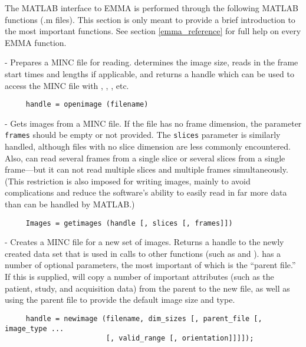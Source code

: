 The MATLAB interface to EMMA is performed through the following MATLAB
functions (.m files).  This section is only meant to provide a brief
introduction to the most important functions.  See section
\ref{emma_reference} for full help on every EMMA function.

\begin{description}

\item {} - Prepares a MINC file for reading.
 determines the image size, reads in the frame start
times and lengths if applicable, and returns a handle which can be
used to access the MINC file with ,
, , etc.
\begin{verbatim}
     handle = openimage (filename)
\end{verbatim}

\item {} - Gets images from a MINC file.  If the
file has no frame dimension, the parameter \verb|frames| should be
empty or not provided.  The \verb|slices| parameter is similarly
handled, although files with no slice dimension are less commonly
encountered.  Also,  can read several frames from a
single slice or several slices from a single frame---but it can not
read multiple slices and multiple frames simultaneously.  (This
restriction is also imposed for writing images, mainly to avoid
complications and reduce the software's ability to easily read in far
more data than can be handled by MATLAB.)
\begin{verbatim}
     Images = getimages (handle [, slices [, frames]])
\end{verbatim}

\item {} - Creates a MINC file for a new set of images.
Returns a handle to the newly created data set that is used in calls
to other functions (such as  and ).
 has a number of optional parameters, the most
important of which is the ``parent file.''  If this is supplied,
 will copy a number of important attributes (such as
the patient, study, and acquisition data) from the parent to the new
file, as well as using the parent file to provide the default image
size and type.
\begin{verbatim}
     handle = newimage (filename, dim_sizes [, parent_file [, image_type ...
                        [, valid_range [, orientation]]]]);
\end{verbatim}


\end{description}

